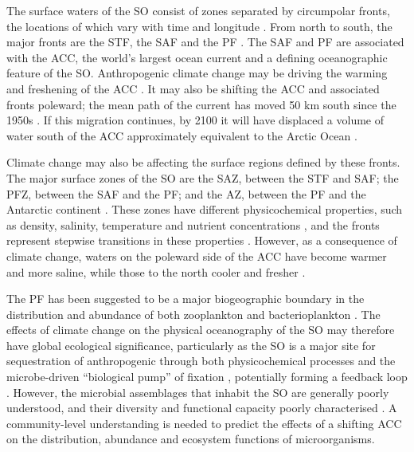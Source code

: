 The surface waters of the \ac{SO} consist of zones separated by circumpolar fronts, the locations of which vary with time and longitude \cite{Whitworth:1980wo,Orsi:1995va,Sokolov:2002tc}.
From north to south, the major fronts are the \ac{STF}, the \ac{SAF} and the \ac{PF} .
The \ac{SAF} and \ac{PF} are associated with the \ac{ACC}, the world's largest ocean current and a defining oceanographic feature of the \ac{SO}.
Anthropogenic climate change may be driving the warming and freshening of the \ac{ACC} \cite{Boning:2008il}.
It may also be shifting the \ac{ACC} and associated fronts poleward; the mean path of the current has moved \textapprox{}50 km south since the 1950s \cite{Gille:2002fr}.
If this migration continues, by 2100 it will have displaced a volume of water south of the \ac{ACC} approximately equivalent to the Arctic Ocean \cite{Fyfe:2005vp}.

Climate change may also be affecting the surface regions defined by these fronts.
The major surface zones of the \ac{SO} are the \ac{SAZ}, between the \ac{STF} and \ac{SAF}; the \ac{PFZ}, between the \ac{SAF} and the \ac{PF}; and the \ac{AZ}, between the \ac{PF} and the Antarctic continent .
These zones have different physicochemical properties, such as density, salinity, temperature and nutrient concentrations \cite{Sokolov:2002tc}, and the fronts represent stepwise transitions in these properties \cite{WhitworthIII:1987ky}.
However, as a consequence of climate change, waters on the poleward side of the \ac{ACC} have become warmer and more saline, while those to the north cooler and fresher \cite{Boning:2008il}.

The \ac{PF} has been suggested to be a major biogeographic boundary in the distribution and abundance of both zooplankton \cite{Chiba:2001un,Hunt:2001vp,Esper:2002ui,Ward:2003db} and bacterioplankton \cite{Selje:2004ka,Abell:2005ji,Giebel:2009hr,Weber:2010fi}.
The effects of climate change on the physical oceanography of the \ac{SO} may therefore have global ecological significance, particularly as the \ac{SO} is a major site for sequestration of anthropogenic  \cite{Sabine:2004fz,MikaloffFletcher:2006ct} through both physicochemical processes and the microbe-driven ``biological pump'' of  fixation \cite{Thomalla:2011hi}, potentially forming a feedback loop \cite{Cox:2000ko}.
However, the microbial assemblages that inhabit the \ac{SO} are generally poorly understood, and their diversity and functional capacity poorly characterised \citep[reviewed in][]{Murray:2007db}.
A community-level understanding is needed to predict the effects of a shifting \ac{ACC} on the distribution, abundance and ecosystem functions of microorganisms.

